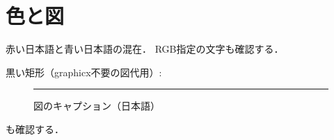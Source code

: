 \documentclass[pdflatex]{jlreq}
\begin{document}
\section{色と図}
{\color{red}赤い日本語}と{\color{blue}青い日本語}の混在．
\textcolor[rgb]{0,0.5,0}{RGB指定の文字}も確認する．

黒い矩形（graphicx不要の図代用）:
\begin{figure}[htbp]
\centering
\rule{3cm}{1cm}
\caption{図のキャプション（日本語）}
\end{figure}
も確認する．
\end{document}
